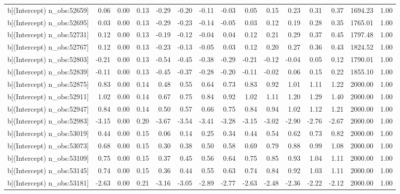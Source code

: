 \begin{table}[ht]
\begin{tabular}{rrrrrrrrrrrrrrr}
  b[(Intercept) n\_obs:52659] & 0.06 & 0.00 & 0.13 & -0.29 & -0.20 & -0.11 & -0.03 & 0.05 & 0.15 & 0.23 & 0.31 & 0.37 & 1694.23 & 1.00 \\ 
  b[(Intercept) n\_obs:52695] & 0.03 & 0.00 & 0.13 & -0.29 & -0.23 & -0.14 & -0.05 & 0.03 & 0.12 & 0.19 & 0.28 & 0.35 & 1765.01 & 1.00 \\ 
  b[(Intercept) n\_obs:52731] & 0.12 & 0.00 & 0.13 & -0.19 & -0.12 & -0.04 & 0.04 & 0.12 & 0.21 & 0.29 & 0.37 & 0.45 & 1797.48 & 1.00 \\ 
  b[(Intercept) n\_obs:52767] & 0.12 & 0.00 & 0.13 & -0.23 & -0.13 & -0.05 & 0.03 & 0.12 & 0.20 & 0.27 & 0.36 & 0.43 & 1824.52 & 1.00 \\ 
  b[(Intercept) n\_obs:52803] & -0.21 & 0.00 & 0.13 & -0.54 & -0.45 & -0.38 & -0.29 & -0.21 & -0.12 & -0.04 & 0.05 & 0.12 & 1790.01 & 1.00 \\ 
  b[(Intercept) n\_obs:52839] & -0.11 & 0.00 & 0.13 & -0.45 & -0.37 & -0.28 & -0.20 & -0.11 & -0.02 & 0.06 & 0.15 & 0.22 & 1855.10 & 1.00 \\ 
  b[(Intercept) n\_obs:52875] & 0.83 & 0.00 & 0.14 & 0.48 & 0.55 & 0.64 & 0.73 & 0.83 & 0.92 & 1.01 & 1.11 & 1.22 & 2000.00 & 1.00 \\ 
  b[(Intercept) n\_obs:52911] & 1.02 & 0.00 & 0.14 & 0.67 & 0.75 & 0.84 & 0.92 & 1.02 & 1.11 & 1.20 & 1.29 & 1.40 & 2000.00 & 1.00 \\ 
  b[(Intercept) n\_obs:52947] & 0.84 & 0.00 & 0.14 & 0.50 & 0.57 & 0.66 & 0.75 & 0.84 & 0.94 & 1.02 & 1.12 & 1.21 & 2000.00 & 1.00 \\ 
  b[(Intercept) n\_obs:52983] & -3.15 & 0.00 & 0.20 & -3.67 & -3.54 & -3.41 & -3.28 & -3.15 & -3.02 & -2.90 & -2.76 & -2.67 & 2000.00 & 1.00 \\ 
  b[(Intercept) n\_obs:53019] & 0.44 & 0.00 & 0.15 & 0.06 & 0.14 & 0.25 & 0.34 & 0.44 & 0.54 & 0.62 & 0.73 & 0.82 & 2000.00 & 1.00 \\ 
  b[(Intercept) n\_obs:53073] & 0.68 & 0.00 & 0.15 & 0.30 & 0.38 & 0.50 & 0.58 & 0.69 & 0.79 & 0.88 & 0.99 & 1.08 & 2000.00 & 1.00 \\ 
  b[(Intercept) n\_obs:53109] & 0.75 & 0.00 & 0.15 & 0.37 & 0.45 & 0.56 & 0.64 & 0.75 & 0.85 & 0.93 & 1.04 & 1.11 & 2000.00 & 1.00 \\ 
  b[(Intercept) n\_obs:53145] & 0.74 & 0.00 & 0.15 & 0.36 & 0.44 & 0.55 & 0.63 & 0.74 & 0.84 & 0.92 & 1.03 & 1.11 & 2000.00 & 1.00 \\ 
  b[(Intercept) n\_obs:53181] & -2.63 & 0.00 & 0.21 & -3.16 & -3.05 & -2.89 & -2.77 & -2.63 & -2.48 & -2.36 & -2.22 & -2.12 & 2000.00 & 1.00 \\ 

\end{tabular}
\end{table}
